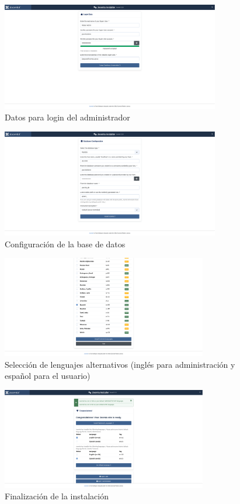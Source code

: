 \documentclass[a4paper]{article}
\begin{document}
\begin{figure}[H]
    \centering
    \includegraphics[width=0.85\textwidth]{images/install-2.png}
    \caption{Datos para login del administrador}
\end{figure}

\begin{figure}[H]
    \centering
    \includegraphics[width=0.85\textwidth]{images/install-3.png}
    \caption{Configuración de la base de datos}
\end{figure}

\begin{figure}[H]
    \centering
    \includegraphics[width=0.8\textwidth]{images/install-4.png}
    \caption{Selección de lenguajes alternativos (inglés para administración y español para el usuario)}
\end{figure}

\begin{figure}[H]
    \centering
    \includegraphics[width=0.8\textwidth]{images/install-5.png}
    \caption{Finalización de la instalación}
\end{figure}
\end{document}
